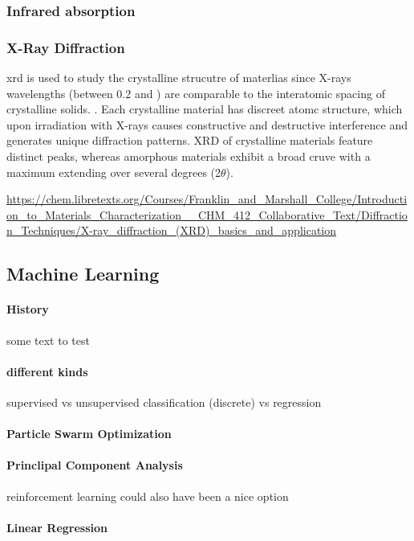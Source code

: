 \subsubsection{Infrared absorption}
\subsubsection{X-Ray Diffraction}
\gls{xrd} is used to study the crystalline strucutre of materlias since X-rays wavelengths (between 0.2 and ) are comparable to the interatomic spacing of crystalline solids.  \cite{Kaliva2020}.
Each crystalline material has discreet atomc structure, which upon irradiation with X-rays causes constructive and destructive interference and generates unique diffraction patterns. 
XRD  of crystalline materials feature distinct peaks, whereas amorphous materials exhibit a broad cruve with a maximum extending over several degrees (2$\theta$).

\url{https://chem.libretexts.org/Courses/Franklin_and_Marshall_College/Introduction_to_Materials_Characterization__CHM_412_Collaborative_Text/Diffraction_Techniques/X-ray_diffraction_(XRD)_basics_and_application}\\


\subsection{Machine Learning}
\paragraph{History}
some text to test
\paragraph{different kinds} 
supervised vs unsupervised
classification (discrete) vs regression
\paragraph{Particle Swarm Optimization}
\paragraph{Princlipal Component Analysis}
reinforcement learning could also have been a nice option
\paragraph{Linear Regression}

